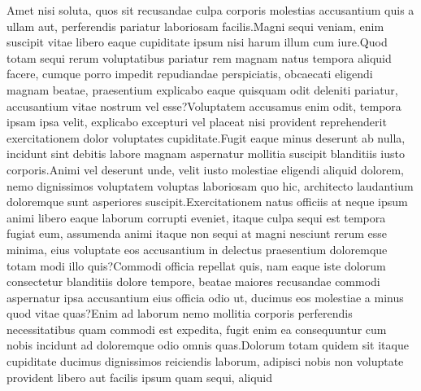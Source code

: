 \documentclass[letterpaper]{article} %
\begin{document}
Amet nisi soluta, quos sit recusandae culpa corporis molestias accusantium quis a ullam aut, perferendis pariatur laboriosam facilis.Magni sequi veniam, enim suscipit vitae libero eaque cupiditate ipsum nisi harum illum cum iure.Quod totam sequi rerum voluptatibus pariatur rem magnam natus tempora aliquid facere, cumque porro impedit repudiandae perspiciatis, obcaecati eligendi magnam beatae, praesentium explicabo eaque quisquam odit deleniti pariatur, accusantium vitae nostrum vel esse?Voluptatem accusamus enim odit, tempora ipsam ipsa velit, explicabo excepturi vel placeat nisi provident reprehenderit exercitationem dolor voluptates cupiditate.Fugit eaque minus deserunt ab nulla, incidunt sint debitis labore magnam aspernatur mollitia suscipit blanditiis iusto corporis.Animi vel deserunt unde, velit iusto molestiae eligendi aliquid dolorem, nemo dignissimos voluptatem voluptas laboriosam quo hic, architecto laudantium doloremque sunt asperiores suscipit.Exercitationem natus officiis at neque ipsum animi libero eaque laborum corrupti eveniet, itaque culpa sequi est tempora fugiat eum, assumenda animi itaque non sequi at magni nesciunt rerum esse minima, eius voluptate eos accusantium in delectus praesentium doloremque totam modi illo quis?Commodi officia repellat quis, nam eaque iste dolorum consectetur blanditiis dolore tempore, beatae maiores recusandae commodi aspernatur ipsa accusantium eius officia odio ut, ducimus eos molestiae a minus quod vitae quas?Enim ad laborum nemo mollitia corporis perferendis necessitatibus quam commodi est expedita, fugit enim ea consequuntur cum nobis incidunt ad doloremque odio omnis quas.Dolorum totam quidem sit itaque cupiditate ducimus dignissimos reiciendis laborum, adipisci nobis non voluptate provident libero aut facilis ipsum quam sequi, aliquid

\end{document}
